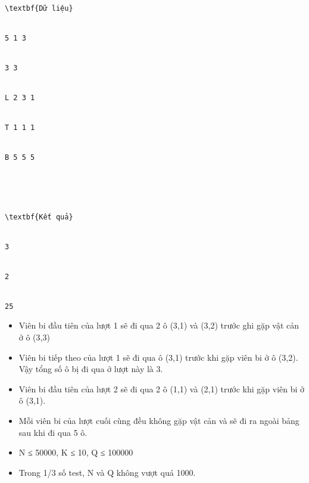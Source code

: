 \begin{verbatim}
\textbf{Dữ liệu}


5 1 3


3 3


L 2 3 1


T 1 1 1


B 5 5 5





\textbf{Kết quả}


3


2


25\end{verbatim}
\begin{itemize}
	\item     Viên bi đầu tiên của lượt 1 sẽ đi qua 2 ô (3,1) và (3,2) trước ghi gặp vật cản ở ô (3,3)   
	\item     Viên bi tiếp theo của lượt 1 sẽ đi qua ô (3,1) trước khi gặp viên bi ở ô (3,2). Vậy tổng số ô bị đi qua ở lượt này là 3.   
	\item     Viên bi đầu tiên của lượt 2 sẽ đi qua 2 ô (1,1) và (2,1) trước khi gặp viên bi ở ô (3,1).   
	\item     Mỗi viên bi của lượt cuối cùng đều không gặp vật cản và sẽ đi ra ngoài bảng sau khi đi qua 5 ô.   
\end{itemize}
\begin{itemize}
	\item     N ≤ 50000, K ≤ 10, Q ≤ 100000   
	\item     Trong 1/3 số test, N và Q không vượt quá 1000.   
\end{itemize}